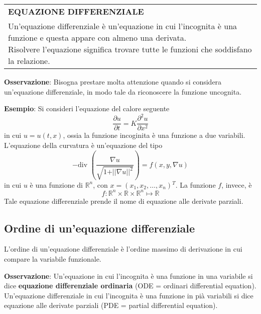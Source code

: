 \documentclass[a4paper]{extarticle}
\renewcommand\arraystretch{}
\begin{document}
\vspace{1em}
\setlength{\tabcolsep}{14pt}
\renewcommand{\arraystretch}{2}
\noindent
\begin{tabularx}{\textwidth}{@{}|P|@{}}
    \hline
    {\textbf{EQUAZIONE DIFFERENZIALE}}\\
    \parbox{\linewidth}{Un'equazione differenziale è un'equazione in cui l'incognita è una funzione e questa appare con almeno una derivata.\\
    Risolvere l'equazione significa trovare tutte le funzioni che soddisfano la relazione.\vspace{3mm}}\\
    \hline
\end{tabularx}

\vspace{2em}
\noindent
\textbf{Osservazione}: Bisogna prestare molta attenzione quando si considera un'equazione differenziale, in modo tale da riconoscere la funzione uncognita.

\vspace{2em}
\noindent
\textbf{Esempio}: Si consideri l'equazione del calore seguente
\[\dfrac{\partial u}{\partial t} = K \dfrac{\partial^2 u}{\partial x^2}\]
in cui $u=u(t,x)$, ossia la funzione incoginita è una funzione a due variabili.\\
L'equazione della curvatura è un'equazione del tipo
\[-\text{div } \left(\dfrac{\nabla u}{\sqrt{1+\vert\vert \nabla u \vert\vert^2}}\right) = f(x,y,\nabla u)\]
in cui $u$ è una funzione di $\mathbb{R}^n$, con $x=(x_1,x_2,\dots,x_n){^T}$. La funzione $f$, invece, è
\[f : \mathbb{R}^n \times \mathbb{R} \times \mathbb{R}^n \longmapsto \mathbb{R}\]
Tale equazione differenziale prende il nome di equazione alle derivate parziali.

\vspace{1em}
\subsection{Ordine di un'equazione differenziale}
L'ordine di un'equazione differenziale è l'ordine massimo di derivazione in cui compare la variabile funzionale.

\vspace{2em}
\noindent
\textbf{Osservazione}: Un'equazione in cui l'incognita è una funzione in una variabile si dice \textbf{equazione differenziale ordinaria} (ODE = ordinari differential equation).\\
Un'equazione differenziale in cui l'incognita è una funzione in pià variabili si dice equazione alle derivate parziali (PDE = partial differential equation).
\end{document}
